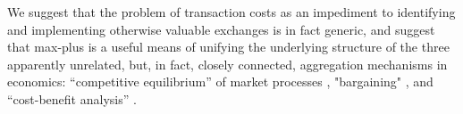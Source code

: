 \documentclass[letterpaper, 10 pt, conference]{ieeeconf}
\begin{document}

We suggest that the problem of transaction costs as an impediment to identifying and implementing otherwise valuable exchanges is in fact generic, and suggest that max-plus is a useful means of unifying the underlying structure of the three apparently unrelated, but, in fact, closely connected, aggregation mechanisms in economics: “competitive equilibrium” of market processes \cite{debreu1959,arrow1971}, "bargaining" \cite{coase1960}, and “cost-benefit analysis” \cite{hicks1939,kaldor1939}.
\end{document}
